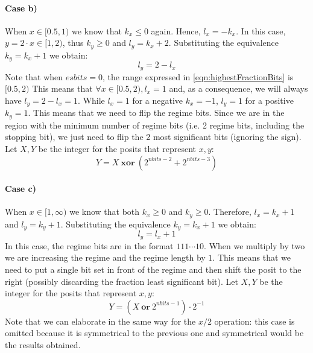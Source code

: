 \paragraph{Case b)} When $x \in [0.5,1)$ we know that $k_x \leq 0$ again. Hence, $l_x = -k_x$. In this case, $y = 2\cdot x \in [1,2)$, thus $k_y \geq 0$ and $l_y = k_x + 2$. Substituting the equivalence $k_y = k_x + 1$ we obtain:
\begin{equation}
    l_y = 2 - l_x
\end{equation}
Note that when $esbits = 0$, the range expressed in \eqref{eqn:highestFractionBits} is $[0.5,2)$ This means that $\forall x \in [0.5,2), l_x = 1$ and, as a consequence, we will always have $l_y = 2 - l_x = 1$. While $l_x = 1$ for a negative $k_x = -1$, $l_y = 1$ for a positive $k_y = 1$. This means that we need to flip the regime bits. Since we are in the region with the minimum number of regime bits (i.e. 2 regime bits, including the stopping bit), we just need to flip the 2 most significant bits (ignoring the sign). Let $X,Y$ be the integer for the posits that represent $x,y$:
\begin{equation}
    Y = X\ \mathbf{xor}\ (2^{nbits - 2} + 2^{nbits - 3})
\end{equation}


\paragraph{Case c)} When $x \in [1,\infty)$ we know that both $k_x \geq 0$ and $k_y \geq 0$. Therefore, $l_x = k_x + 1$ and $l_y = k_y + 1$. Substituting the equivalence $k_y = k_x + 1$ we obtain:
\begin{equation}
    l_y = l_x + 1
\end{equation}
In this case, the regime bits are in the format $111 \cdots 10$. When we multiply by two we are increasing the regime and the regime length by $1$. This means that we need to put a single bit set in front of the regime and then shift the posit to the right (possibly discarding the fraction least significant bit). Let $X,Y$ be the integer for the posits that represent $x,y$:
\begin{equation}
    Y = (X\ \mathbf{or}\ 2^{nbits - 1}) \cdot 2^{-1}
\end{equation}
Note that we can elaborate in the same way for the $x/2$ operation: this case is omitted because it is symmetrical to the previous one and symmetrical would be the results obtained. 



